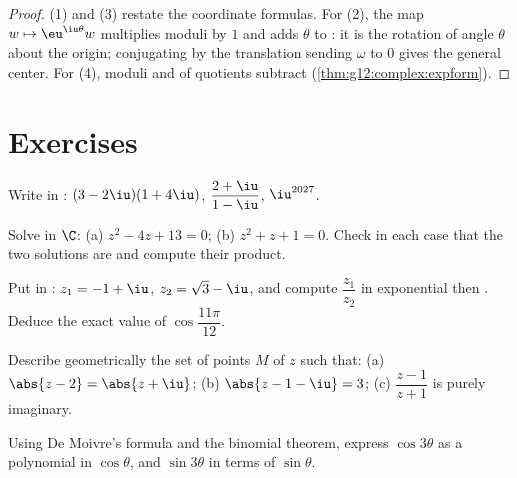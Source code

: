 \begin{proof}
(1) and (3) restate the coordinate formulas. For (2), the map
$w \mapsto \eu^{\iu\theta} w$ multiplies moduli by $1$ and adds $\theta$ to
: it is the rotation of angle $\theta$ about the origin; conjugating
by the translation sending $\omega$ to $0$ gives the general center. For
(4), moduli and  of quotients subtract
(\cref{thm:g12:complex:expform}).
\end{proof}

\section{Exercises}

\begin{exercise}[$\star$]\label{exo:g12:complex:1}
Write in :
$(3 - 2\iu)(1 + 4\iu)$, \quad $\dfrac{2 + \iu}{1 - \iu}$, \quad
$\iu^{2027}$.
\end{exercise}

\begin{exercise}[$\star$]\label{exo:g12:complex:2}
Solve in $\C$: (a) $z^2 - 4z + 13 = 0$; (b) $z^2 + z + 1 = 0$. Check in each
case that the two solutions are  and compute their product.
\end{exercise}

\begin{exercise}[$\star$]\label{exo:g12:complex:3}
Put in : $z_1 = -1 + \iu$, $z_2 = \sqrt3 - \iu$, and compute
$\dfrac{z_1}{z_2}$ in exponential then . Deduce the exact
value of $\cos\dfrac{11\pi}{12}$.
\end{exercise}

\begin{exercise}[$\star\star$]\label{exo:g12:complex:4}
Describe geometrically the set of points $M$ of  $z$ such that:
(a) $\abs{z - 2} = \abs{z + \iu}$;\quad
(b) $\abs{z - 1 - \iu} = 3$;\quad
(c) $\dfrac{z - 1}{z + 1}$ is purely imaginary.
\end{exercise}

\begin{exercise}[$\star\star$]\label{exo:g12:complex:5}
Using De Moivre's formula and the binomial theorem, express $\cos 3\theta$
as a polynomial in $\cos\theta$, and $\sin 3\theta$ in terms of
$\sin\theta$.
\end{exercise}

